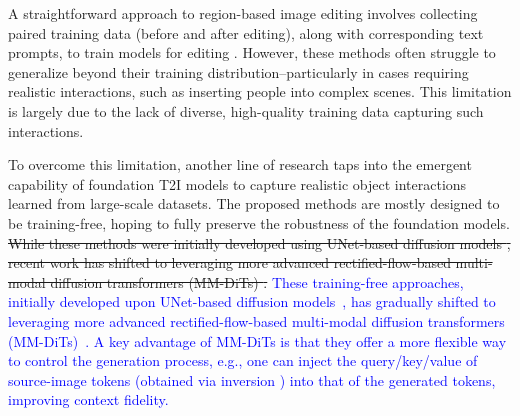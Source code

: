 \documentclass{article}
\newenvironment{cyanpar}{\color{cyan}}{}
\newcommand{\kc}[1]{\textcolor{blue}{#1}}
\begin{document}
\begin{cyanpar}

A straightforward approach to region-based image editing involves collecting paired training data (before and after editing), along with corresponding text prompts, to train models for editing \citep{brooks2023instructpix2pix, zhang2023magicbrush, wasserman2024paint, li2024brushedit, hui2024hq, wei2024omniedit}. However, these methods often struggle to generalize beyond their training distribution--particularly in cases requiring realistic interactions, such as inserting people into complex scenes. This limitation is largely due to the lack of diverse, high-quality training data capturing such interactions.

\end{cyanpar}

To overcome this limitation, another line of research taps into the emergent capability of foundation T2I models to capture realistic object interactions learned from large-scale datasets.
The proposed methods are mostly designed to be training-free, hoping to fully preserve the robustness of the foundation models.
\sout{While these methods were initially developed using UNet-based diffusion models \citep{hertz2022prompt, cao2023masactrl, tumanyan2023plug}, recent work has shifted to leveraging more advanced rectified-flow-based multi-modal diffusion transformers (MM-DiTs) \citep{rout2024semantic, wang2024taming, deng2024fireflow, tewel2025addit, zhu2025kv}.}
\kc{These training-free approaches, initially developed upon UNet-based diffusion models~\citep{hertz2022prompt, cao2023masactrl, tumanyan2023plug}, has gradually shifted to leveraging more advanced rectified-flow-based multi-modal diffusion transformers (MM-DiTs)~\citep{rout2024semantic, wang2024taming, deng2024fireflow, tewel2025addit, zhu2025kv}.
A key advantage of MM-DiTs is that they offer a more flexible way to control the generation process, e.g., one can inject the query/key/value of source-image tokens (obtained via inversion \citep{deng2024fireflow,rout2024semantic,wang2024taming}) into that of the generated tokens, improving context fidelity.}
\end{document}
